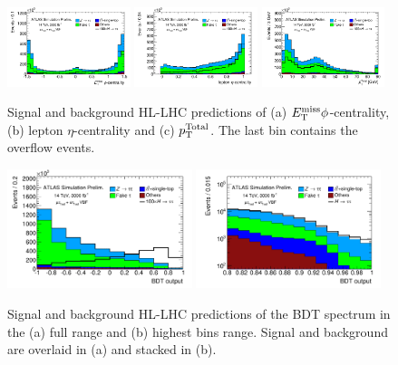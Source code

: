 \begin{figure}[!htpb]
  \centering
  \includegraphics[width=0.32\textwidth]{figures/ATL-PHYS-PUB-2014-018/fig_05a}
  \includegraphics[width=0.32\textwidth]{figures/ATL-PHYS-PUB-2014-018/fig_05b}
  \includegraphics[width=0.32\textwidth]{figures/ATL-PHYS-PUB-2014-018/fig_05c}
  \caption{Signal and background HL-LHC predictions of (a) $E_{\mathrm{T}}^{\mathrm{miss}} \phi$-centrality, (b) $\text{lepton}$ $\eta$-centrality and (c) $p_{\mathrm{T}}^\text{Total}$. The last bin contains the overflow events.}
  \label{fig:prospects-hllhc-other}
\end{figure}

\begin{figure}[!htpb]
  \centering
  \includegraphics[width=0.48\textwidth]{figures/ATL-PHYS-PUB-2014-018/fig_06a}
  \includegraphics[width=0.48\textwidth]{figures/ATL-PHYS-PUB-2014-018/fig_06b}
  \caption{Signal and background HL-LHC predictions of the BDT spectrum in the (a) full range and (b) highest bins range. Signal and background are overlaid in (a) and stacked in (b).}
  \label{fig:prospects-hllhc-bdts}
\end{figure}

